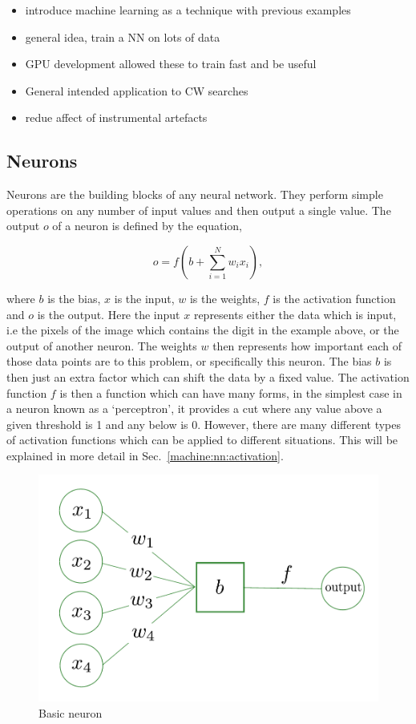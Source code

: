 \begin{itemize}
    \item introduce machine learning as a technique with previous examples
    \item general idea, train a NN on lots of data
    \item GPU development allowed these to train fast and be useful
    \item General intended application to CW searches
    \item redue affect of instrumental artefacts
\end{itemize}

\subsection{\label{machine:nn:neuron}Neurons}

Neurons are the building blocks of any neural network.
They perform simple operations on any number of input values and then output a single value.
The output $o$ of a neuron is defined by the equation,

\begin{equation}
    o = f\left(b + \sum_{i=1}^{N} w_i x_i  \right),
    \label{machine:nn:neuron:equation}
\end{equation}

where $b$ is the bias, $x$ is the input, $w$ is the weights, $f$ is the activation function and $o$ is the output.
Here the input $x$ represents either the data which is input, i.e the pixels of the image which contains the digit in the example above, or the output of another neuron.
The weights $w$ then represents how important each of those data points are to this problem, or specifically this neuron. 
The bias $b$ is then just an extra factor which can shift the data by a fixed value.
The activation function $f$ is then a function which can have many forms, in the simplest case in a neuron known as a `perceptron', it provides a cut where any value above a given threshold is 1 and any below is 0. 
However, there are many different types of activation functions which can be applied to different situations.
This will be explained in more detail in Sec.~\ref{machine:nn:activation}.

\begin{figure}[h]
    \centering
    \includegraphics[width=0.6\columnwidth]{C3_cnn/neuron.pdf}
    \caption{Basic neuron}
    \label{machine:nn:neuron:plot}
\end{figure}

